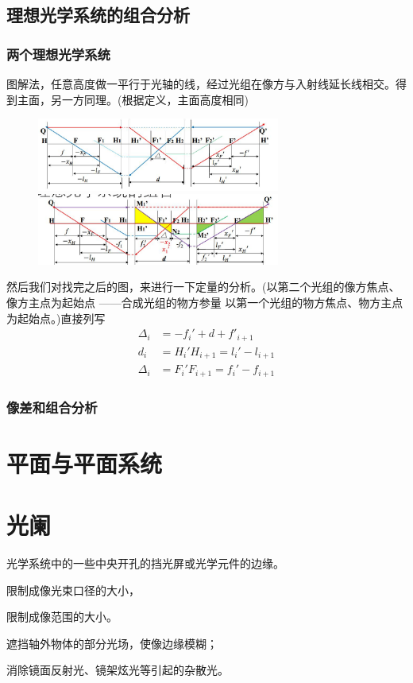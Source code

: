 \subsection{理想光学系统的组合分析}
\subsubsection{两个理想光学系统}
图解法，任意高度做一平行于光轴的线，经过光组在像方与入射线延长线相交。得到主面，另一方同理。(根据定义，主面高度相同)
        \begin{figure}[H]
            \centering
            \includegraphics[width=8cm]{img/3.8.png}
            \includegraphics[width=8cm]{img/3.9.png}
        \end{figure}
然后我们对找完之后的图，来进行一下定量的分析。(以第二个光组的像方焦点、像方主点为起始点
——合成光组的物方参量 以第一个光组的物方焦点、物方主点为起始点。)直接列写
\begin{align}
    \Delta_i &=-f_i'+d+f'_{i+1} \tag{2.3.7.a} \\
     d_i&= H_i'H_{i+1}=l_i'-l_{i+1}\tag{2.3.7.b} \\
    \Delta_i&=F_i'F_{i+1}=f_i'-f_{i+1}\tag{2.3.7.c}
\end{align}
 
\subsubsection{像差和组合分析}
\section{平面与平面系统}
\section{光阑}
\begin{description}[leftmargin=1.7cm,style=nextline,nosep]%
    \item[光阑 ]  光学系统中的一些中央开孔的挡光屏或光学元件的边缘。
    \item[孔径光阑    ] 限制成像光束口径的大小，
    \item[视场光阑    ] 限制成像范围的大小。
    \item[渐晕光阑
    ]遮挡轴外物体的部分光场，使像边缘模糊；

    
    \item[消杂光光阑    ]  消除镜面反射光、镜架炫光等引起的杂散光。

\end{description}
